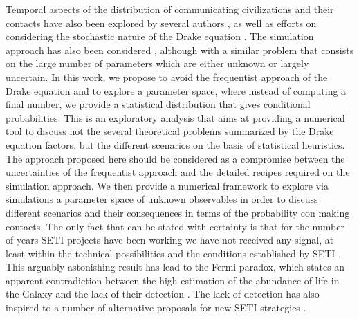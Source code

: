 \Fpagebreak


Temporal aspects of the distribution of communicating civilizations
and their contacts have also been explored by several authors
\citep{fogg_temporal_1987, forgan_spatiotemporal_2011,
balbi_impact_2018, balb_spatiotemporal_2018, horvat_impact_2011},
%
as well as efforts on considering the stochastic nature of the Drake
equation \citep{glade_stochastic_2011}.
%
The simulation approach has also been considered
\citep{forgan_evaluating_2015, vukotic_grandeur_2016,
murante_simulating_2015, forgan_numerical_2009, forgan_galactic_2017},
although with a similar problem that consists on the large number of
parameters which are either unknown or largely uncertain.
%
%
%
In this work, we propose to avoid the frequentist approach of the
Drake equation and to explore a parameter space, where instead of
computing a final number, we provide a statistical distribution that
gives conditional probabilities.
%
This is an exploratory analysis that aims at providing a numerical
tool to discuss not the several theoretical problems summarized by the
Drake equation factors, but the different scenarios on the basis of
statistical heuristics.
%
The approach proposed here should be considered as a compromise between
the uncertainties of the frequentist approach and the detailed recipes
required on the simulation approach.
%
We then provide a numerical framework to explore via simulations a
parameter space of unknown observables in order to discuss different
scenarios and their consequences in terms of the probability con
making contacts.
%
The only fact that can be stated with certainty is that for the number
of years SETI projects have been working we have not received any
signal, at least within the technical possibilities and the conditions
established by SETI \citep{tarter_search_2001}.
%
This arguably astonishing result has lead to the Fermi paradox, which
states an apparent contradiction between the high estimation of the
abundance of life in the Galaxy and the lack of their detection
\citep{vanhouten_isthere_2017}.
%
The lack of detection has also inspired to a number of alternative
proposals for new SETI strategies \citep{forgan_exoplanet_2017,
balbi_impact_2018, loeb_eavesdropping_2006, maccone_KLT_2010,
tarter_advancing_2009, enriquez_breakthrough_2017, loeb_relative_2016,
maccone_SETI_2011,  lingam_relative_2019, wright_theGsearch_2015,
maccone_SETI_2013, maccone_lognormals_2014, harp_application_2018,
forgan_possibility_2013, forgan_galactic_2017, funes_searching_2019}.
 


